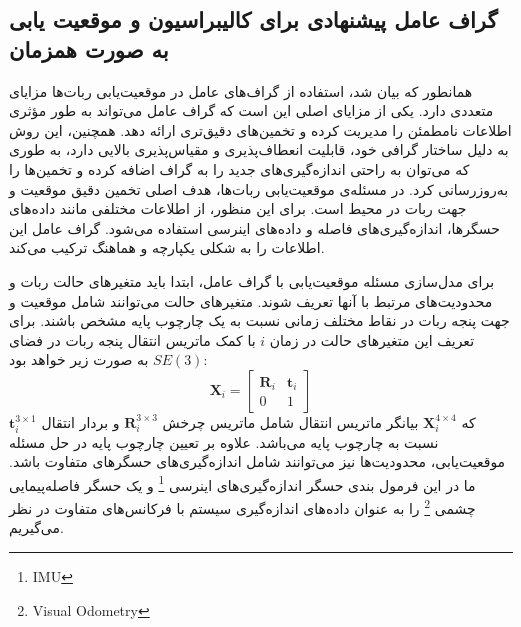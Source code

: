 \subsection{گراف عامل پیشنهادی برای کالیبراسیون و موقعیت یابی به صورت همزمان}
  
همانطور که بیان شد، استفاده از گراف‌های عامل در موقعیت‌یابی ربات‌ها مزایای متعددی دارد. یکی از مزایای اصلی این است که گراف عامل می‌تواند به طور مؤثری اطلاعات نامطمئن را مدیریت کرده و تخمین‌های دقیق‌تری ارائه دهد. همچنین، این روش به دلیل ساختار گرافی خود، قابلیت انعطاف‌پذیری و مقیاس‌پذیری بالایی دارد، به طوری که می‌توان به راحتی اندازه‌گیری‌های جدید را به گراف اضافه کرده و تخمین‌ها را به‌روزرسانی کرد. در مسئله‌ی موقعیت‌یابی ربات‌ها، هدف اصلی تخمین دقیق موقعیت و جهت ربات در محیط است. برای این منظور، از اطلاعات مختلفی مانند داده‌های حسگرها، اندازه‌گیری‌های فاصله و داده‌های اینرسی استفاده می‌شود. گراف عامل این اطلاعات را به شکلی یکپارچه و هماهنگ ترکیب می‌کند.

برای مدل‌سازی مسئله موقعیت‌یابی با گراف عامل، ابتدا باید متغیرهای حالت ربات و محدودیت‌های مرتبط با آنها تعریف شوند. متغیرهای حالت می‌توانند شامل موقعیت و جهت پنجه ربات در نقاط مختلف زمانی نسبت به یک چارچوب پایه مشخص باشند. برای تعریف این متغیرهای حالت در زمان $i$ با کمک ماتریس انتقال پنجه ربات در فضای
$SE(3)$
به صورت زیر خواهد بود:
\begin{equation} \label{eq:transformation matrix}
	\boldsymbol{X}_i = \begin{bmatrix}
							\mathbf{R}_i & \mathbf{t}_i \\
								0 & 1
				     	\end{bmatrix}
\end{equation}
که 
$\boldsymbol{X}_i^{4\times4}$
 بیانگر ماتریس انتقال شامل ماتریس چرخش 
$\mathbf{R}_i^{3\times3}$
 و بردار انتقال 
 $ \mathbf{t}_i^{3\times1}$ 
 نسبت به چارچوب پایه می‌باشد. علاوه بر تعیین چارچوب پایه در حل مسئله موقعیت‌یابی، محدودیت‌ها نیز می‌توانند
شامل اندازه‌گیری‌های حسگرهای متفاوت باشد. 
 ما در این فرمول بندی
 حسگر اندازه‌گیری‌های اینرسی
\footnote{IMU} 
 و یک حسگر فاصله‌پیمایی چشمی
\footnote{Visual Odometry}
را به عنوان داده‌های اندازه‌گیری سیستم با فرکانس‌های متفاوت در نظر می‌گیریم. 

